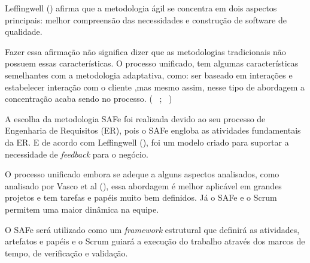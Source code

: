 Leffingwell (\citeyear{safe}) afirma que a metodologia ágil se concentra em dois aspectos principais: 
melhor compreensão das necessidades e construção de software de qualidade. 

Fazer essa afirmação não significa dizer que as metodologias tradicionais não possuem essas características. O processo unificado, 
tem algumas características semelhantes com a metodologia adaptativa, como: ser baseado em interações e estabelecer interação com o cliente
,mas mesmo assim, nesse tipo de abordagem a concentração acaba sendo no processo. (~\cite{safe} ; ~\cite{vasco})

A escolha da metodologia SAFe foi realizada devido ao seu processo de Engenharia de Requisitos (ER), pois o SAFe engloba as atividades
fundamentais da ER. E de acordo com Leffingwell (\citeyear{safe}), foi um modelo criado para suportar a necessidade de \textit{feedback}
para o negócio. 

O processo unificado embora se adeque a alguns aspectos analisados, como analisado por Vasco et al (\citeyear{vasco}),
essa abordagem é melhor  aplicável em grandes projetos e tem tarefas e papéis muito bem definidos.
Já o SAFe e o Scrum permitem uma maior dinâmica na equipe.

O SAFe será utilizado como um \textit{framework} estrutural que definirá as atividades, artefatos e papéis e o Scrum guiará
a execução do trabalho através dos marcos de tempo, de verificação e validação.
